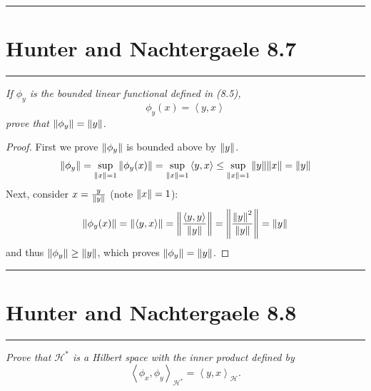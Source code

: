 \documentclass{article} %
\theoremstyle{plain}
\newcommand{\VEC}[2]{\left\langle #1, #2 \right\rangle}
\newcommand{\problem}[1]{
\vspace{.375cm}
\begin{minipage}{\textwidth}
    \begin{center}
        \noindent\rule{5cm}{1pt}
    \end{center}
    \section{\bf #1}
    \begin{center}
        \noindent\rule{5cm}{1pt}
    \end{center}
    \vspace{0.25cm}
\end{minipage}
}
\numberwithin{equation}{section} %
\numberwithin{figure}{section} %
\numberwithin{table}{section} %
\begin{document}
\problem{Hunter and Nachtergaele 8.7}
\emph{If $\phi_y$ is the bounded linear functional defined in (8.5),}
\begin{equation}
    \tag{\it 8.5}
    \phi_y(x) = \VEC{y}{x}
\end{equation}
\emph{prove that $\norm{\phi_y} = \norm{y}$.} \\

\begin{proof}
    First we prove $\norm{\phi_y}$ is bounded above by $\norm{y}$.
    \begin{align*}
        \norm{\phi_y} = \sup_{\norm{x} = 1}\norm{\phi_y(x)} = \sup_{\norm{x} = 1}\VEC{y}{x} \leq \sup_{\norm{x} = 1}\norm{y}\norm{x} = \norm{y}
    \end{align*}
    Next, consider $x = \frac{y}{\norm{y}}$ (note $\norm{x} = 1$):
    \begin{align*}
        \norm{\phi_y(x)} = \norm{\VEC{y}{x}} = \norm{\frac{\VEC{y}{y}}{\norm{y}}} = \norm{\frac{\norm{y}^2}{\norm{y}}} = \norm{y}
    \end{align*}
    and thus $\norm{\phi_y} \geq \norm{y}$, which proves $\norm{\phi_y} = \norm{y}$.
\end{proof}










\problem{Hunter and Nachtergaele 8.8}
\emph{Prove that $\mathcal{H}^*$ is a Hilbert space with the inner product defined by $$ \VEC{\phi_x}{\phi_y}_{\mathcal{H}^*} = \VEC{y}{x}_\mathcal{H}.$$}
\end{document}

